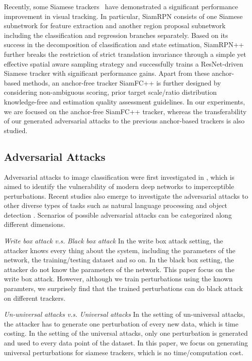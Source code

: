 \documentclass[journal]{IEEEtran}
\begin{document}
Recently, some Siamese trackers~\cite{SiamRPN,SiamRPN++,SiamFC++} have demonstrated a significant performance improvement in visual tracking. 
In particular, SiamRPN \cite{SiamRPN} consists of one Siamese subnetwork for feature extraction and another region proposal subnetwork including the classification and regression branches separately. Based on its success in the decomposition of classification and state estimation, SiamRPN++ \cite{SiamRPN++} further breaks the restriction of strict translation invariance through a simple yet effective spatial aware sampling strategy and successfully trains a ResNet-driven Siamese tracker with significant performance gains. Apart from these anchor-based methods, an anchor-free tracker SiamFC++ \cite{SiamFC++} is further designed by considering non-ambiguous scoring, prior target scale/ratio distribution knowledge-free and estimation quality assessment guidelines.
In our experiments, we are focused on the anchor-free SiamFC++ tracker, whereas the transferability of our generated adversarial attacks to the previous anchor-based trackers is also studied.

\subsection{Adversarial Attacks}

Adversarial attacks to image classification were first investigated in \cite{intriguing}, which is aimed to identify the vulnerability of modern deep networks to imperceptible perturbations. 
Recent studies also emerge to investigate the adversarial attacks to other diverse types of tasks such as natural language processing \cite{generating} and object detection \cite{wei2019transferable}.
Scenarios of possible adversarial attacks can be categorized along different dimensions.

\textit{Write box attack v.s. Black box attack} In the write box attack setting, the attacker knows every thing about the system, including the parameters of the network, the training/testing dataset and so on. In the black box setting, the attacker do not know the parameters of the network. This paper focus on the write box attack. However, although we train perturbations using the known paramters, we surprisely find that the trained perturbations can do black attack on different trackers.

\textit{Un-universal attacks v.s. Universal attacks} In the setting of un-universal attacks, the attacker has to generate one perturbation of every new data, which is time costing. In the setting of the universal attacks, only one perturbation is generated and used to every data point of the dataset. In this paper, we focus on generating universal perturbations for siamese trackers, which is no time/computation cost.
\end{document}
